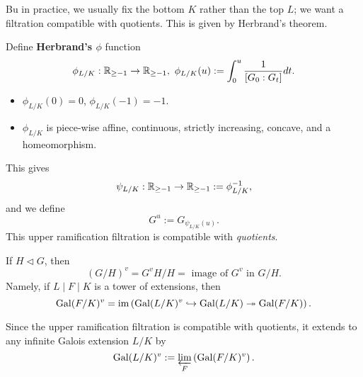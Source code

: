 Bu in practice, we usually fix the bottom $K$ rather than the top $L$; we want a filtration compatible with quotients.
This is given by Herbrand's theorem.

Define \textbf{Herbrand's $\phi$} function\[\phi_{L/K} :\mathbb{R}_{\ge -1}\to\mathbb{R}_{\ge -1},\ \phi_{L/K}(u) := \int_0^u \frac{1}{[G_0 : G_t]}dt.\]
\begin{itemize}
    \item $\phi_{L/K}(0) = 0$, $\phi_{L/K}(-1) = -1$.
    \item $\phi_{L/K}$ is piece-wise affine, continuous, strictly increasing, concave, and a homeomorphism.
\end{itemize}
This gives \[\psi_{L/K} : \mathbb{R}_{\ge -1}\to\mathbb{R}_{\ge -1} := \phi_{L/K}^{-1},\]
and we define \[G^u := G_{\psi_{L/K}(u)}.\]
This upper ramification filtration is compatible with \textit{quotients}.
\begin{theorem}
    If $H\vartriangleleft G$,
    then \[(G/H)^v = G^vH/H = \text{ image of }G^v\text{ in }G/H.\]
    Namely, if $L\mid F\mid K$ is a tower of extensions,
    then \[\operatorname{Gal}(F/K)^v = \operatorname{im}\left( \operatorname{Gal}(L/K)^v\hookrightarrow\operatorname{Gal}(L/K)\twoheadrightarrow\operatorname{Gal}(F/K) \right).\]
\end{theorem}
Since the upper ramification filtration is compatible with quotients,
it extends to any infinite Galois extension $L/K$ by
\[\operatorname{Gal}(L/K)^v := \varprojlim_F\left( \operatorname{Gal}(F/K)^v \right).\]



